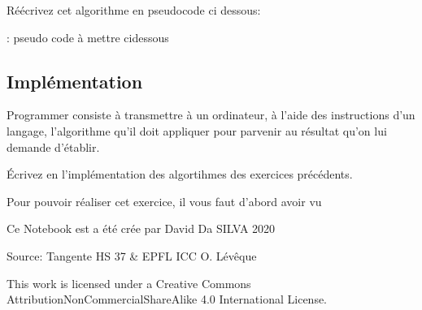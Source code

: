 \documentclass[letterpaper,10pt,english]{sphinxmanual}
\begin{document}
Réécrivez cet algorithme en pseudo\sphinxhyphen{}code ci dessous:

 : pseudo code à mettre ci\sphinxhyphen{}dessous


\subsection{Implémentation}
\label{\detokenize{src/OCI_HS1_Algorithmes:implementation}}
Programmer consiste à transmettre à un ordinateur, à l’aide des instructions d’un langage, l’algorithme qu’il doit appliquer pour parvenir au résultat qu’on lui demande d’établir.

Écrivez en  l’implémentation des algortihmes des exercices précédents.

Pour pouvoir réaliser cet exercice, il vous faut d’abord avoir vu {\hyperref[\detokenize{src/OCI04_Boucles::doc}]{}}

Ce Notebook est a été crée par David Da SILVA \sphinxhyphen{} 2020

Source: Tangente HS 37 \& EPFL ICC \sphinxhyphen{} O. Lévêque

This work is licensed under a Creative Commons Attribution\sphinxhyphen{}NonCommercial\sphinxhyphen{}ShareAlike 4.0 International License.







\renewcommand{\indexname}{Index}
\printindex
\end{document}
